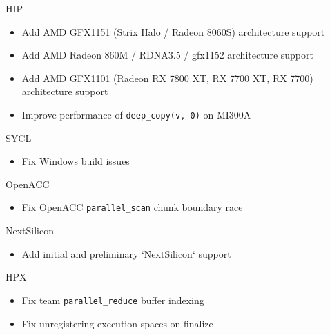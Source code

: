 
\begin{frame}[fragile]

  {\Large HIP}
  \begin{itemize}
    \item Add AMD GFX1151 (Strix Halo / Radeon 8060S) architecture support
    \item Add AMD Radeon 860M / RDNA3.5 / gfx1152 architecture support
    \item Add AMD GFX1101 (Radeon RX 7800 XT, RX 7700 XT, RX 7700) architecture support
    \item Improve performance of \texttt{deep\_copy(v, 0)} on MI300A
  \end{itemize}

\end{frame}


\begin{frame}[fragile]

  {\Large SYCL}
  \begin{itemize}
    \item Fix Windows build issues
  \end{itemize}

  \vspace{10pt}
  {\Large OpenACC}
  \begin{itemize}
    \item Fix OpenACC \texttt{parallel\_scan} chunk boundary race
  \end{itemize}

  \vspace{10pt}
  {\Large NextSilicon}
  \begin{itemize}
    \item Add initial and preliminary `NextSilicon` support
  \end{itemize}

  \vspace{10pt}
  {\Large HPX}
  \begin{itemize}
    \item Fix team \texttt{parallel\_reduce} buffer indexing
    \item Fix unregistering execution spaces on finalize
  \end{itemize}

\end{frame}

